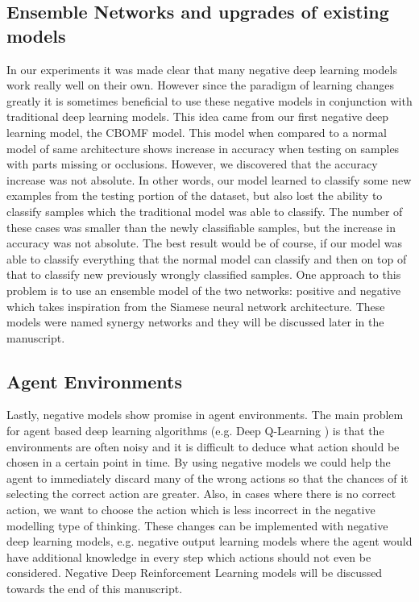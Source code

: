 \documentclass[b5paper]{book}
\let\cite\parencite
\begin{document}
\subsection{Ensemble Networks and upgrades of existing models}

In our experiments it was made clear that many negative deep learning models work really well on their own. However since the paradigm of learning changes greatly it is sometimes beneficial to use these negative models in conjunction with traditional deep learning models. This idea came from our first negative deep learning model, the CBOMF model. This model when compared to a normal model of same architecture shows increase in accuracy when testing on samples with parts missing or occlusions. However, we discovered that the accuracy increase was not absolute. In other words, our model learned to classify some new examples from the testing portion of the dataset, but also lost the ability to classify samples which the traditional model was able to classify. The number of these cases was smaller than the newly classifiable samples, but the increase in accuracy was not absolute. The best result would be of course, if our model was able to classify everything that the normal model can classify and then on top of that to classify new previously wrongly classified samples. One approach to this problem is to use an ensemble model of the two networks: positive and negative which takes inspiration from the Siamese neural network architecture. These models were named synergy networks \cite{milovsevic2019classification} and they will be discussed later in the manuscript.

\subsection{Agent Environments}

Lastly, negative models show promise in agent environments. The main problem for agent based deep learning algorithms (e.g. Deep Q-Learning \cite{mnih2013playing}) is that the environments are often noisy and it is difficult to deduce what action should be chosen in a certain point in time. By using negative models we could help the agent to immediately discard many of the wrong actions so that the chances of it selecting the correct action are greater. Also, in cases where there is no correct action, we want to choose the action which is less incorrect in the negative modelling type of thinking. These changes can be implemented with negative deep learning models, e.g. negative output learning models where the agent would have additional knowledge in every step which actions should not even be considered. Negative Deep Reinforcement Learning models will be discussed towards the end of this manuscript.
\end{document}
